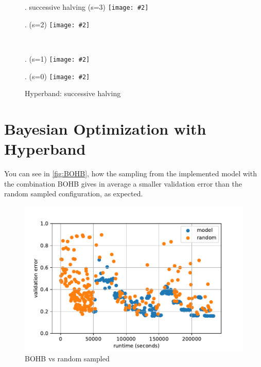 \documentclass[11pt,a4paper,DIV=14,headinclude=false,footinclude=false]{scrartcl}
\begin{document}
\begin{figure}[h]\centering
    \newcommand\trimmedgraphics[2][]{\texttt{[image: \#2]}}
    \begin{minipage}{.5\textwidth} . successive halving (s=3)
        \trimmedgraphics{plots/HB_s=3.pdf}
    \end{minipage}\hfill
    \begin{minipage}{.5\textwidth}.  (s=2)
        \trimmedgraphics{plots/HB_s=2.pdf}
     \end{minipage}\\[\baselineskip]
    \begin{minipage}{.5\textwidth} . (s=1)
        \trimmedgraphics{plots/HB_s=1.pdf}
    \end{minipage}\hfill
    \begin{minipage}{.5\textwidth}. (s=0)
        \trimmedgraphics{plots/HB_s=0.pdf}
     \end{minipage}
     \caption{Hyperband: successive halving}\label{fig:HB}
\end{figure}
\section{Bayesian Optimization with Hyperband}
You can see in \autoref{fig:BOHB}, how the sampling from the implemented model with the combination BOHB gives in average a smaller validation error than the random sampled configuration, as expected.
\begin{figure}[H]\centering
\includegraphics[width=0.6\linewidth]{plots/BOHB.pdf}
\caption{BOHB vs random sampled}\label{fig:BOHB}
\end{figure}
\end{document}
